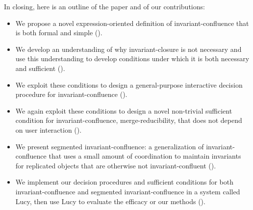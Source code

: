 In closing, here is an outline of the paper and of our contributions:
\begin{itemize}
  \item
    We propose a novel expression-oriented definition of invariant-confluence
    that is both formal and simple ().

  \item
    We develop an understanding of why invariant-closure is not necessary and
    use this understanding to develop conditions under which it is both
    necessary and sufficient ().

  \item
    We exploit these conditions to design a general-purpose interactive
    decision procedure for invariant-confluence
    ().

  \item
    We again exploit these conditions to design a novel non-trivial sufficient
    condition for invariant-confluence, merge-reducibility, that does not
    depend on user interaction ().

  \item
    We present segmented invariant-confluence: a generalization of
    invariant-confluence that uses a small amount of coordination to maintain
    invariants for replicated objects that are otherwise not
    invariant-confluent ().

  \item
    We implement our decision procedures and sufficient conditions for both
    invariant-confluence and segmented invariant-confluence in a system called
    Lucy, then use Lucy to evaluate the efficacy or our methods
    ().
\end{itemize}

